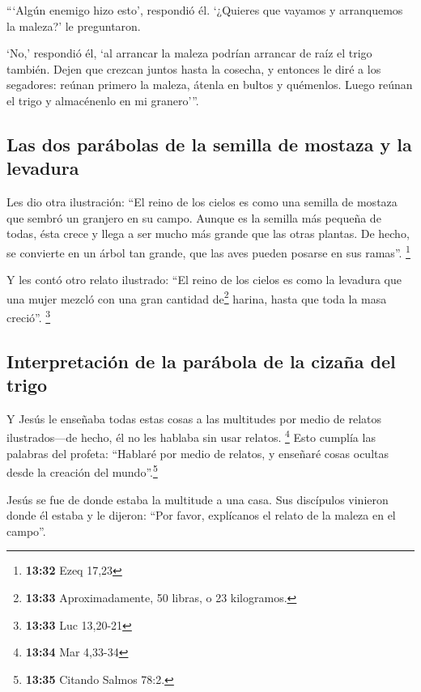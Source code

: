  ```Algún enemigo hizo esto', respondió él. `¿Quieres que
vayamos y arranquemos la maleza?' le preguntaron.

 `No,' respondió él, `al arrancar la maleza podrían
arrancar de raíz el trigo también.  Dejen que crezcan
juntos hasta la cosecha, y entonces le diré a los segadores: reúnan
primero la maleza, átenla en bultos y quémenlos. Luego reúnan el trigo y
almacénenlo en mi granero'''.

\hypertarget{las-dos-paruxe1bolas-de-la-semilla-de-mostaza-y-la-levadura}{%
\subsection{Las dos parábolas de la semilla de mostaza y la
levadura}\label{las-dos-paruxe1bolas-de-la-semilla-de-mostaza-y-la-levadura}}

 Les dio otra ilustración: ``El reino de los cielos es
como una semilla de mostaza que sembró un granjero en su campo.
 Aunque es la semilla más pequeña de todas, ésta crece y
llega a ser mucho más grande que las otras plantas. De hecho, se
convierte en un árbol tan grande, que las aves pueden posarse en sus
ramas''. \footnote{\textbf{13:32} Ezeq 17,23}

 Y les contó otro relato ilustrado: ``El reino de los
cielos es como la levadura que una mujer mezcló con una gran cantidad
de\footnote{\textbf{13:33} Aproximadamente, 50 libras, o 23 kilogramos.}
harina, hasta que toda la masa creció''. \footnote{\textbf{13:33} Luc
  13,20-21}

\hypertarget{interpretaciuxf3n-de-la-paruxe1bola-de-la-cizauxf1a-del-trigo}{%
\subsection{Interpretación de la parábola de la cizaña del
trigo}\label{interpretaciuxf3n-de-la-paruxe1bola-de-la-cizauxf1a-del-trigo}}

 Y Jesús le enseñaba todas estas cosas a las multitudes
por medio de relatos ilustrados---de hecho, él no les hablaba sin usar
relatos. \footnote{\textbf{13:34} Mar 4,33-34}  Esto
cumplía las palabras del profeta: ``Hablaré por medio de relatos, y
enseñaré cosas ocultas desde la creación del mundo''.\footnote{\textbf{13:35}
  Citando Salmos 78:2.}

 Jesús se fue de donde estaba la multitude a una casa.
Sus discípulos vinieron donde él estaba y le dijeron: ``Por favor,
explícanos el relato de la maleza en el campo''.

